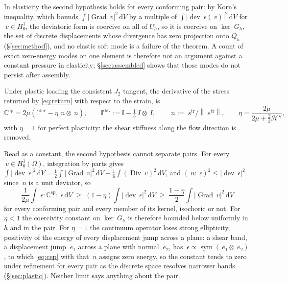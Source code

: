 \documentclass[11pt]{article}
\newcommand{\Id}{~I}
\newcommand{\eps}{~\epsilon}
\newcommand{\sdev}{~s}
\newcommand{\Grad}{\operatorname{Grad}}
\newcommand{\Div}{\operatorname{Div}}
\newcommand{\dev}{\operatorname{dev}}
\newcommand{\sym}{\operatorname{sym}}
\newcommand{\norm}[1]{\left\lVert #1 \right\rVert}
\newcommand{\diff}{\,\mathrm{d}}
\newcommand{\supdev}{^{\mathrm{dev}}}
\theoremstyle{definition}
\theoremstyle{plain}
\begin{document}
In elasticity the second hypothesis holds for every conforming pair: by
Korn's inequality, which bounds $\int \lvert\Grad ~v\rvert^2 \diff V$ by a
multiple of $\int \lvert\dev\eps(~v)\rvert^2 \diff V$ for $~v \in H^1_0$,
the deviatoric form is coercive on all of $U_h$, so it is coercive on
$\ker ~G_h$, the set of discrete displacements whose divergence has zero
projection onto $Q_h$ (\S\ref{sec:method}), and no elastic soft mode is a
failure of the theorem.
A count of exact zero-energy modes on one element is therefore not an argument
against a constant pressure in elasticity; \S\ref{sec:assembled} shows that
those modes do not persist after assembly.

Under plastic loading the consistent $J_2$ tangent, the derivative of the
stress returned by \eqref{eq:return} with respect to the strain, is
\begin{equation}
  \label{eq:cep}
  \mathbb{C}^{\mathrm{ep}} = 2\mu \left( \mathbb{I}\supdev - \eta\, ~n \otimes ~n \right),
  \qquad
  \mathbb{I}\supdev := \mathbb{I} - \tfrac13 \Id \otimes \Id,
  \qquad
  ~n := \sdev^{\mathrm{tr}} / \norm{\sdev^{\mathrm{tr}}},
  \qquad
  \eta = \frac{2\mu}{2\mu + \tfrac{2}{3}\mathcal{H}''} ,
\end{equation}
with $\eta = 1$ for perfect plasticity: the shear stiffness along the flow
direction is removed.

Read as a constant, the second hypothesis cannot separate pairs. For every $~v \in H^1_0(\Omega)$,
integration by parts gives $\int \lvert\dev\eps\rvert^2 \diff V =
\tfrac12 \int \lvert\Grad ~v\rvert^2 \diff V + \tfrac16 \int (\Div ~v)^2
\diff V$, and $(~n : \eps)^2 \le \lvert\dev\eps\rvert^2$ since $~n$ is a
unit deviator, so
\begin{equation}
  \label{eq:floor}
  \frac{1}{2\mu} \int \eps : \mathbb{C}^{\mathrm{ep}} : \eps \diff V
  \;\ge\; (1 - \eta) \int \lvert\dev\eps\rvert^2 \diff V
  \;\ge\; \frac{1 - \eta}{2} \int \lvert\Grad ~v\rvert^2 \diff V
\end{equation}
for every conforming pair and every member of its kernel, isochoric or not.
For $\eta < 1$ the coercivity constant on $\ker ~G_h$ is therefore bounded
below uniformly in $h$ and in the pair. For $\eta = 1$ the continuum
operator loses strong ellipticity, positivity of the energy of every
displacement jump across a plane: a shear band, a displacement jump
$~e_1$ across a plane with normal $~e_2$, has $\eps \propto \sym(~e_1 \otimes ~e_2)$, to which \eqref{eq:cep} with
that $~n$ assigns zero energy, so the constant tends to zero under refinement for
every pair as the discrete space resolves narrower bands
(\S\ref{sec:plastic}). Neither limit says anything about the pair.
\end{document}
